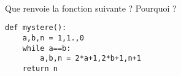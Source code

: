 \exer{[NBR-002]}
\setcounter{numques}{0}~\\

\question{} Que renvoie la fonction suivante ? Pourquoi ? 
\begin{lstlisting}
def mystere():
    a,b,n = 1,1.,0
    while a==b:
        a,b,n = 2*a+1,2*b+1,n+1
    return n
\end{lstlisting}
